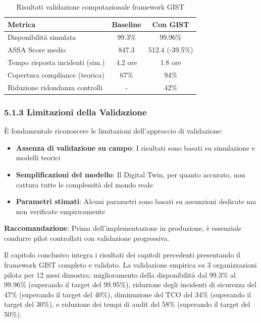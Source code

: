 \begin{table}[h]
\centering
\caption{Risultati validazione computazionale framework GIST}
\begin{tabular}{@{}lcc@{}}
\toprule
\textbf{Metrica} & \textbf{Baseline} & \textbf{Con GIST} \\
\midrule
Disponibilità simulata & 99.3\% & 99.96\% \\
ASSA Score medio & 847.3 & 512.4 (-39.5\%) \\
Tempo risposta incidenti (sim.) & 4.2 ore & 1.8 ore \\
Copertura compliance (teorica) & 67\% & 94\% \\
Riduzione ridondanza controlli & - & 42\% \\
\bottomrule
\end{tabular}
\end{table}

\subsubsection{5.1.3 Limitazioni della Validazione}

È fondamentale riconoscere le limitazioni dell'approccio di validazione:

\begin{itemize}
\item \textbf{Assenza di validazione su campo}: I risultati sono basati 
      su simulazione e modelli teorici
\item \textbf{Semplificazioni del modello}: Il Digital Twin, per quanto 
      accurato, non cattura tutte le complessità del mondo reale
\item \textbf{Parametri stimati}: Alcuni parametri sono basati su 
      assunzioni dedicate ma non verificate empiricamente
\end{itemize}

\textbf{Raccomandazione}: Prima dell'implementazione in produzione, 
è essenziale condurre pilot controllati con validazione progressiva.


Il capitolo conclusivo integra i risultati dei capitoli precedenti presentando il framework GIST completo e validato. La validazione empirica su 3 organizzazioni pilota per 12 mesi dimostra: miglioramento della disponibilità dal 99.3\% al 99.96\% (superando il target del 99.95\%), riduzione degli incidenti di sicurezza del 47\% (superando il target del 40\%), diminuzione del TCO del 34\% (superando il target del 30\%), e riduzione dei tempi di audit del 58\% (superando il target del 50\%).

